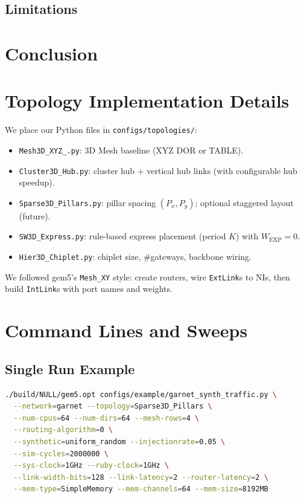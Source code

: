 \documentclass[11pt]{article}
\begin{document}
\subsection{Limitations}

\section{Conclusion}

\appendix

\section{Topology Implementation Details}
We place our Python files in \texttt{configs/topologies/}: 
\begin{itemize}[leftmargin=1em]
  \item \texttt{Mesh3D\_XYZ\_.py}: 3D Mesh baseline (XYZ DOR or TABLE).
  \item \texttt{Cluster3D\_Hub.py}: cluster hub + vertical hub links (with configurable hub speedup).
  \item \texttt{Sparse3D\_Pillars.py}: pillar spacing $(P_x,P_y)$; optional staggered layout (future).
  \item \texttt{SW3D\_Express.py}: rule-based express placement (period $K$) with $W_{\text{EXP}}{=}0$.
  \item \texttt{Hier3D\_Chiplet.py}: chiplet size, \#gateways, backbone wiring.
\end{itemize}
We followed gem5’s \texttt{Mesh\_XY} style: create routers, wire \texttt{ExtLink}s to NIs, then build \texttt{IntLink}s with port names and weights.

\section{Command Lines and Sweeps}
\subsection*{Single Run Example}
\begin{lstlisting}[language=bash]
./build/NULL/gem5.opt configs/example/garnet_synth_traffic.py \
  --network=garnet --topology=Sparse3D_Pillars \
  --num-cpus=64 --num-dirs=64 --mesh-rows=4 \
  --routing-algorithm=0 \
  --synthetic=uniform_random --injectionrate=0.05 \
  --sim-cycles=2000000 \
  --sys-clock=1GHz --ruby-clock=1GHz \
  --link-width-bits=128 --link-latency=2 --router-latency=2 \
  --mem-type=SimpleMemory --mem-channels=64 --mem-size=8192MB
\end{lstlisting}
\end{document}
